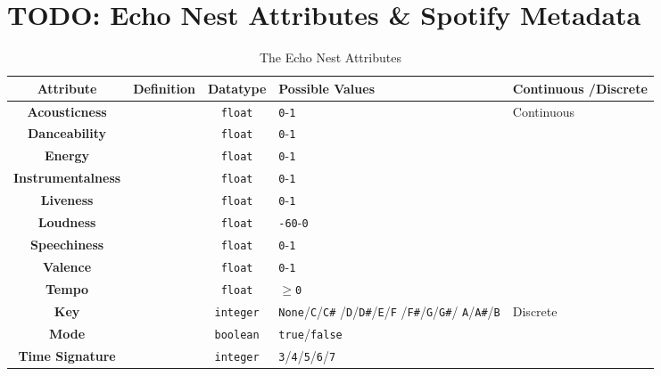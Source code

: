 \section{TODO: Echo Nest Attributes \& Spotify Metadata}
\begin{longtable}[c]{|c|c|c|p{5em}|p{5.5em}|}
    \caption{The Echo Nest Attributes}\\%
    \toprule
    \textbf{Attribute} & \textbf{Definition} & \textbf{Datatype} & \textbf{Possible Values} & \textbf{Continuous /Discrete} \\
    \midrule
    \endfirsthead

    \textbf{Acousticness} & & \texttt{float} & \texttt{0}-\texttt{1} & \multirow{9}{*}{Continuous}\\*
    \cmidrule{1-4}
    \textbf{Danceability} & & \texttt{float} & \texttt{0}-\texttt{1} & \\*\cmidrule{1-4}
    \textbf{Energy} & & \texttt{float} & \texttt{0}-\texttt{1} & \\*\cmidrule{1-4}
    \textbf{Instrumentalness} & & \texttt{float} & \texttt{0}-\texttt{1} & \\*\cmidrule{1-4}
    \textbf{Liveness} & & \texttt{float} & \texttt{0}-\texttt{1} & \\*\cmidrule{1-4}
    \textbf{Loudness} & & \texttt{float} & \texttt{-60}-\texttt{0} & \\*\cmidrule{1-4}
    \textbf{Speechiness} & & \texttt{float} & \texttt{0}-\texttt{1} & 
    \\*\cmidrule{1-4}
    \textbf{Valence} & & \texttt{float} & \texttt{0}-\texttt{1} & \\*\cmidrule{1-4}
    \textbf{Tempo} & & \texttt{float} & \(\ge\)\texttt{0} & \\*
    \midrule
    \textbf{Key} & & \texttt{integer} & \texttt{None}/\texttt{C}/\texttt{C\#} /\texttt{D}/\texttt{D\#}/\texttt{E}/\texttt{F} /\texttt{F\#}/\texttt{G}/\texttt{G\#}/ \texttt{A}/\texttt{A\#}/\texttt{B} & \multirow{3}{*}{Discrete}\\*
    \cmidrule{1-4}
    \textbf{Mode} & & \texttt{boolean} & \texttt{true}/\texttt{false} & \\*
    \cmidrule{1-4}
    \textbf{Time Signature} & & \texttt{integer} & \texttt{3}/\texttt{4}/\texttt{5}/\texttt{6}/\texttt{7} & \\*
    \midrule
    
\end{longtable}

